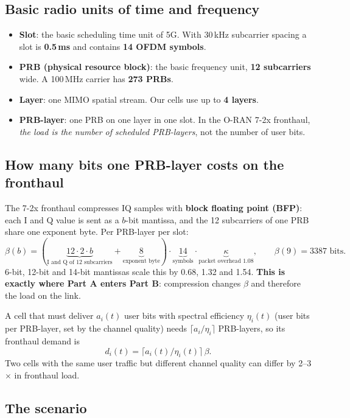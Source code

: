 \documentclass[11pt,a4paper]{article}
\begin{document}
\subsection{Basic radio units of time and frequency}

\begin{itemize}
  \item \textbf{Slot}: the basic scheduling time unit of 5G. With 30\,kHz subcarrier spacing a slot is \textbf{0.5\,ms} and contains \textbf{14 OFDM symbols}.
  \item \textbf{PRB (physical resource block)}: the basic frequency unit, \textbf{12 subcarriers} wide. A 100\,MHz carrier has \textbf{273 PRBs}.
  \item \textbf{Layer}: one MIMO spatial stream. Our cells use up to \textbf{4 layers}.
  \item \textbf{PRB-layer}: one PRB on one layer in one slot. In the O-RAN 7-2x fronthaul, \emph{the load is the number of scheduled PRB-layers}, not the number of user bits.
\end{itemize}

\subsection{How many bits one PRB-layer costs on the fronthaul}

The 7-2x fronthaul compresses IQ samples with \textbf{block floating point (BFP)}: each I and Q value is sent as a $b$-bit mantissa, and the 12 subcarriers of one PRB share one exponent byte. Per PRB-layer per slot:
\[
  \beta(b) = (\underbrace{12\cdot 2\cdot b}_{\text{I and Q of 12 subcarriers}} + \underbrace{8}_{\text{exponent byte}})\cdot \underbrace{14}_{\text{symbols}}\cdot \underbrace{\kappa}_{\text{packet overhead }1.08}, \qquad \beta(9) = 3387\text{ bits}.
\]
6-bit, 12-bit and 14-bit mantissas scale this by 0.68, 1.32 and 1.54. \textbf{This is exactly where Part A enters Part B}: compression changes $\beta$ and therefore the load on the link.

A cell that must deliver $a_i(t)$ user bits with spectral efficiency $\eta_i(t)$ (user bits per PRB-layer, set by the channel quality) needs $\lceil a_i/\eta_i\rceil$ PRB-layers, so its fronthaul demand is
\[ d_i(t) = \lceil a_i(t)/\eta_i(t)\rceil\,\beta . \]
Two cells with the same user traffic but different channel quality can differ by 2--3$\times$ in fronthaul load.

\subsection{The scenario}
\end{document}
